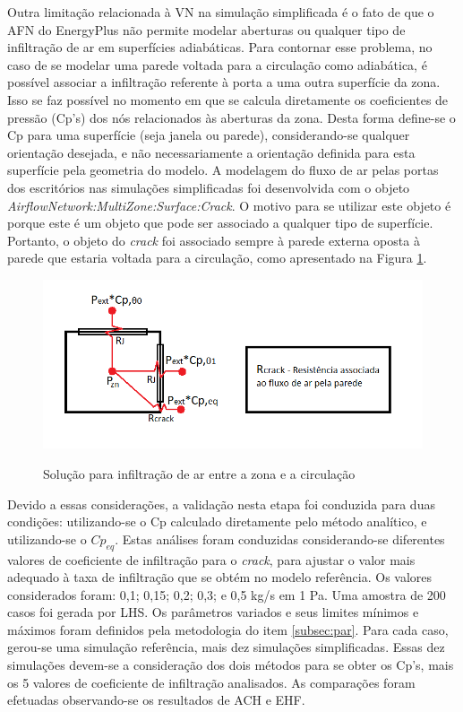 \documentclass[brazil,hardcopy,openany,a5paper]{ufscthesis}
\begin{document}
		Outra limitação relacionada à VN na simulação simplificada é o fato de que o AFN do EnergyPlus não permite modelar aberturas ou qualquer tipo de infiltração de ar em superfícies adiabáticas. Para contornar esse problema, no caso de se modelar uma parede voltada para a circulação como adiabática, é possível associar a infiltração referente à porta a uma outra superfície da zona.  %
		Isso se faz possível no momento em que se calcula diretamente os coeficientes de pressão (Cp's) dos nós relacionados às aberturas da zona.
		Desta forma define-se o Cp para uma superfície (seja janela ou parede), considerando-se qualquer orientação desejada, e não necessariamente a orientação definida para esta superfície pela geometria do modelo.		
		A modelagem do fluxo de ar pelas portas dos escritórios nas simulações simplificadas foi desenvolvida com o objeto \textit{AirflowNetwork:MultiZone:Surface:Crack}. O motivo para se utilizar este objeto é porque este é um objeto que pode ser associado a qualquer tipo de superfície. Portanto, o objeto do \textit{crack} foi associado sempre à parede externa oposta à parede que estaria voltada para a circulação, como apresentado na Figura \ref{fig:AFN_crack}.
		
		\begin{figure}[h]
			\centering
			\caption{Solução para infiltração de ar entre a zona e a circulação}
			\includegraphics[width=1\linewidth]{img/AFN_crack.png}
			\label{fig:AFN_crack}
		\end{figure}	
					
		Devido a essas considerações, a validação nesta etapa foi conduzida para duas condições: utilizando-se o Cp calculado diretamente pelo método analítico, e utilizando-se o $Cp_{eq}$.		
		Estas análises foram conduzidas considerando-se diferentes valores de coeficiente de infiltração para o \textit{crack}, para ajustar o valor mais adequado à taxa de infiltração que se obtém no modelo referência. Os valores considerados foram: 0,1; 0,15; 0,2; 0,3; e 0,5 kg/s em 1 Pa.
		Uma amostra de 200 casos foi gerada por LHS.
		Os parâmetros variados e seus limites mínimos e máximos foram definidos pela metodologia do item \ref{subsec:par}.
		Para cada caso, gerou-se uma simulação referência, mais dez simulações simplificadas. Essas dez simulações devem-se a consideração dos dois métodos para se obter os Cp's, mais os 5 valores de coeficiente de infiltração analisados. As comparações foram efetuadas observando-se os resultados de ACH e EHF. 
		
\end{document}
